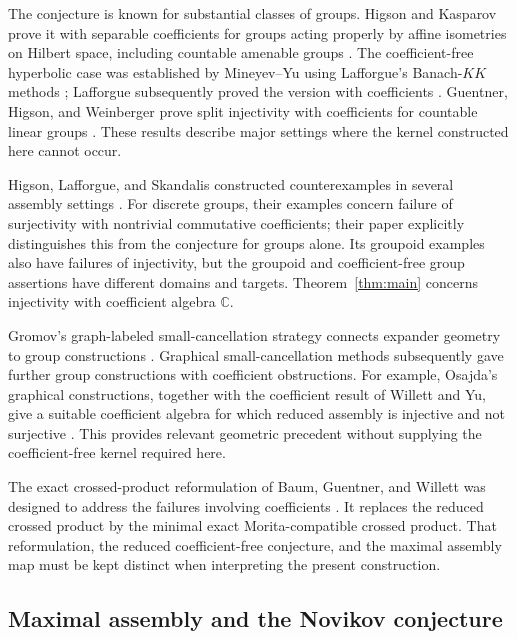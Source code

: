 The conjecture is known for substantial classes of groups. Higson and
Kasparov prove it with separable coefficients for groups acting properly by affine
isometries on Hilbert space, including countable amenable groups
\cite[Theorem~9.1 and Corollary~9.2]{HK01}. The coefficient-free hyperbolic
case was established by Mineyev--Yu using Lafforgue's Banach-$KK$ methods
\cite[Theorem~20]{MY02}; Lafforgue subsequently proved the version with
coefficients \cite[Theorem~0.4]{Laf12}. Guentner, Higson, and Weinberger
prove split injectivity with coefficients for countable linear groups
\cite[Theorem~3]{GHW05}. These results describe major settings where the kernel
constructed here cannot occur.


Higson, Lafforgue, and Skandalis constructed counterexamples in several
assembly settings \cite{HLS02}.  For discrete groups, their examples
concern failure of surjectivity with nontrivial commutative coefficients;
their paper explicitly distinguishes this from the conjecture for groups
alone.  Its groupoid examples also have failures of injectivity, but the
groupoid and coefficient-free group assertions have different domains
and targets.  Theorem~\ref{thm:main} concerns injectivity with coefficient
algebra $\mathbb C$.

Gromov's graph-labeled small-cancellation strategy connects expander
geometry to group constructions \cite[\S4.8]{Gro03}.
Graphical small-cancellation methods subsequently gave further group
constructions with coefficient obstructions.  For example,
Osajda's graphical constructions, together with the coefficient result of
Willett and Yu, give a suitable coefficient algebra for which reduced
assembly is injective and not surjective
\cite[Corollary~3.4]{Osa20}\cite[Corollary~1.7]{WY12}.
This provides relevant geometric precedent without supplying the
coefficient-free kernel required here.

The exact crossed-product reformulation of Baum, Guentner, and Willett
was designed to address the failures involving coefficients
\cite{BGW16}.  It replaces the reduced crossed product by the minimal
exact Morita-compatible crossed product.  That reformulation, the reduced
coefficient-free conjecture, and the maximal assembly map must be kept
distinct when interpreting the present construction.

\subsection{Maximal assembly and the Novikov conjecture}

